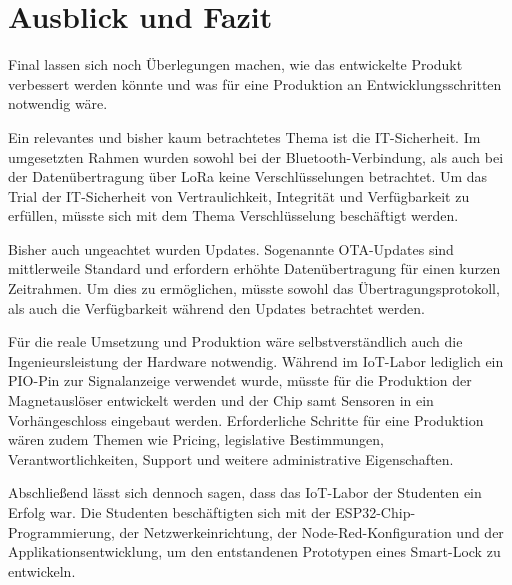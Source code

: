 
\chapter{Ausblick und Fazit}
Final lassen sich noch Überlegungen machen, wie das entwickelte Produkt verbessert werden könnte und was für eine Produktion an Entwicklungsschritten notwendig wäre.

Ein relevantes und bisher kaum betrachtetes Thema ist die IT-Sicherheit. Im umgesetzten Rahmen wurden sowohl bei der Bluetooth-Verbindung, als auch bei der Datenübertragung über LoRa keine Verschlüsselungen betrachtet. Um das Trial der IT-Sicherheit von Vertraulichkeit, Integrität und Verfügbarkeit zu erfüllen, müsste sich mit dem Thema Verschlüsselung beschäftigt werden.

Bisher auch ungeachtet wurden Updates. Sogenannte \ac{OTA}-Updates sind mittlerweile Standard und erfordern erhöhte Datenübertragung für einen kurzen Zeitrahmen. Um dies zu ermöglichen, müsste sowohl das Übertragungsprotokoll, als auch die Verfügbarkeit während den Updates betrachtet werden.

Für die reale Umsetzung und Produktion wäre selbstverständlich auch die Ingenieursleistung der Hardware notwendig. Während im \ac{IoT}-Labor lediglich ein \ac{PIO}-Pin zur Signalanzeige verwendet wurde, müsste für die Produktion der Magnetauslöser entwickelt werden und der Chip samt Sensoren in ein Vorhängeschloss eingebaut werden. Erforderliche Schritte für eine Produktion wären zudem Themen wie Pricing, legislative Bestimmungen, Verantwortlichkeiten, Support und weitere administrative Eigenschaften.

Abschließend lässt sich dennoch sagen, dass das \ac{IoT}-Labor der Studenten ein Erfolg war. Die Studenten beschäftigten sich mit der ESP32-Chip-Programmierung, der Netzwerkeinrichtung, der Node-Red-Konfiguration und der Applikationsentwicklung, um den entstandenen Prototypen eines Smart-Lock zu entwickeln.